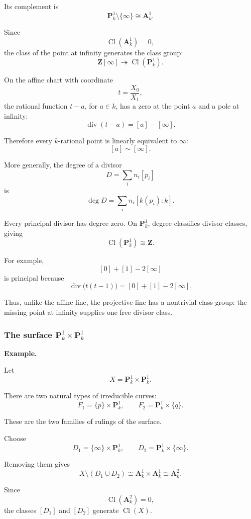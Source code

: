 \documentclass[12pt,a4paper]{article}
\theoremstyle{notespace}
\begin{document}
Its complement is
\[
\mathbf P^1_k\setminus\{\infty\}\cong\mathbf A^1_k.
\]

Since
\[
\operatorname{Cl}(\mathbf A^1_k)=0,
\]
the class of the point at infinity generates the class group:
\[
\mathbf Z[\infty]\twoheadrightarrow\operatorname{Cl}(\mathbf P^1_k).
\]

On the affine chart with coordinate
\[
t=\frac{X_0}{X_1},
\]
the rational function \(t-a\), for \(a\in k\), has a zero at the point \(a\) and a pole at infinity:
\[
\operatorname{div}(t-a)
=
[a]-[\infty].
\]

Therefore every \(k\)-rational point is linearly equivalent to \(\infty\):
\[
[a]\sim[\infty].
\]

More generally, the degree of a divisor
\[
D=\sum_i n_i[p_i]
\]
is
\[
\deg D=\sum_i n_i[k(p_i):k].
\]

Every principal divisor has degree zero. On \(\mathbf P^1_k\), degree classifies divisor classes, giving
\[
\boxed{
	\operatorname{Cl}(\mathbf P^1_k)\cong\mathbf Z.
}
\]

For example,
\[
[0]+[1]-2[\infty]
\]
is principal because
\[
\operatorname{div}\bigl(t(t-1)\bigr)
=
[0]+[1]-2[\infty].
\]

Thus, unlike the affine line, the projective line has a nontrivial class group: the missing point at infinity supplies one free divisor class.

\subsubsection{\texorpdfstring{The surface \(\mathbf P^1_k\times\mathbf P^1_k\)}{The surface P1 times P1}}

\textbf{Example.}

Let
\[
X=\mathbf P^1_k\times\mathbf P^1_k.
\]

There are two natural types of irreducible curves:
\[
F_1=\{p\}\times\mathbf P^1_k,
\qquad
F_2=\mathbf P^1_k\times\{q\}.
\]

These are the two families of rulings of the surface.

Choose
\[
D_1=\{\infty\}\times\mathbf P^1_k,
\qquad
D_2=\mathbf P^1_k\times\{\infty\}.
\]

Removing them gives
\[
X\setminus(D_1\cup D_2)
\cong
\mathbf A^1_k\times\mathbf A^1_k
\cong
\mathbf A^2_k.
\]

Since
\[
\operatorname{Cl}(\mathbf A^2_k)=0,
\]
the classes \([D_1]\) and \([D_2]\) generate \(\operatorname{Cl}(X)\).
\end{document}
